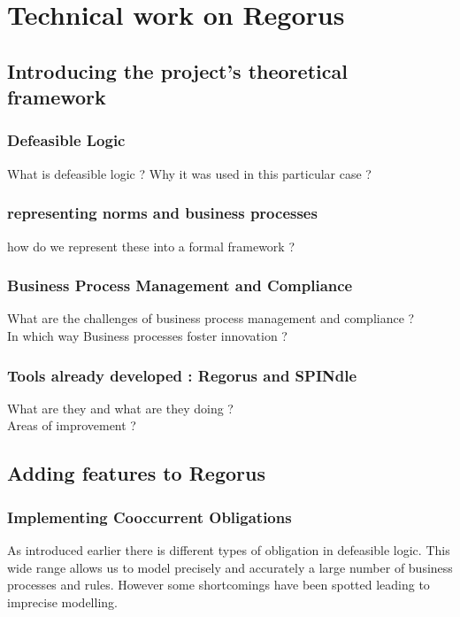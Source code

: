 \documentclass[10pt]{article}
\begin{document}
\newpage
\section{Technical work on Regorus}
\subsection{Introducing the project's theoretical framework}
\subsubsection{Defeasible Logic}
What is defeasible logic ?
Why it was used in this particular case ?

\subsubsection{representing norms and business processes}
how do we represent these into a formal framework ?

\subsubsection{Business Process Management and Compliance}
What are the challenges of business process management and compliance ?\\
In which way Business processes foster innovation ?

\subsubsection{Tools already developed : Regorus and SPINdle}
What are they and what are they doing ?\\
Areas of improvement ?


\newpage
\subsection{Adding features to Regorus}
\subsubsection{Implementing Cooccurrent Obligations}
As introduced earlier there is different types of obligation in defeasible logic. This wide range allows us to model precisely and accurately a large number of business processes and rules. However some shortcomings have been spotted leading to imprecise modelling.
\end{document}
